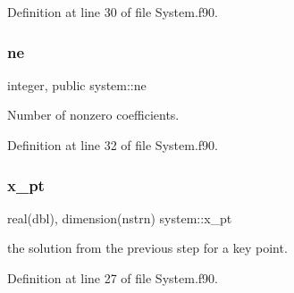 Definition at line 30 of file System.\+f90.

\mbox{\label{namespacesystem_a8c97c1868622a50b42869db23d0a2f11}} 
\subsubsection{\texorpdfstring{ne}{ne}}
{\footnotesize\ttfamily integer, public system\+::ne}



Number of nonzero coefficients. 



Definition at line 32 of file System.\+f90.

\mbox{\label{namespacesystem_a9db5b0f39df1dc763bd7885fa9f4389d}} 
\subsubsection{\texorpdfstring{x\+\_\+pt}{x\_pt}}
{\footnotesize\ttfamily real(dbl), dimension(nstrn) system\+::x\+\_\+pt\hspace{0.3cm}{\ttfamily [private]}}



the solution from the previous step for a key point. 



Definition at line 27 of file System.\+f90.

